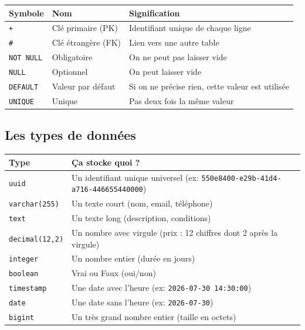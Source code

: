 \documentclass[12pt,a4paper]{article}
\begin{document}
\vspace{12pt}

\noindent\begin{tabularx}{\textwidth}{l l X}
    \toprule
    \textbf{Symbole} & \textbf{Nom} & \textbf{Signification} \\
    \midrule
    \texttt{+} & Clé primaire (PK) & Identifiant unique de chaque ligne \\
    \texttt{\#} & Clé étrangère (FK) & Lien vers une autre table \\
    \texttt{NOT NULL} & Obligatoire & On ne peut pas laisser vide \\
    \texttt{NULL} & Optionnel & On peut laisser vide \\
    \texttt{DEFAULT} & Valeur par défaut & Si on ne précise rien, cette valeur est utilisée \\
    \texttt{UNIQUE} & Unique & Pas deux fois la même valeur \\
    \bottomrule
\end{tabularx}

\subsection{Les types de données}

\noindent\begin{tabularx}{\textwidth}{l X}
    \toprule
    \textbf{Type} & \textbf{Ça stocke quoi ?} \\
    \midrule
    \texttt{uuid} & Un identifiant unique universel (ex: \texttt{550e8400-e29b-41d4-a716-446655440000}) \\
    \texttt{varchar(255)} & Un texte court (nom, email, téléphone) \\
    \texttt{text} & Un texte long (description, conditions) \\
    \texttt{decimal(12,2)} & Un nombre avec virgule (prix : 12 chiffres dont 2 après la virgule) \\
    \texttt{integer} & Un nombre entier (durée en jours) \\
    \texttt{boolean} & Vrai ou Faux (oui/non) \\
    \texttt{timestamp} & Une date avec l'heure (ex: \texttt{2026-07-30 14:30:00}) \\
    \texttt{date} & Une date sans l'heure (ex: \texttt{2026-07-30}) \\
    \texttt{bigint} & Un très grand nombre entier (taille en octets) \\
    \bottomrule
\end{tabularx}
\end{document}

